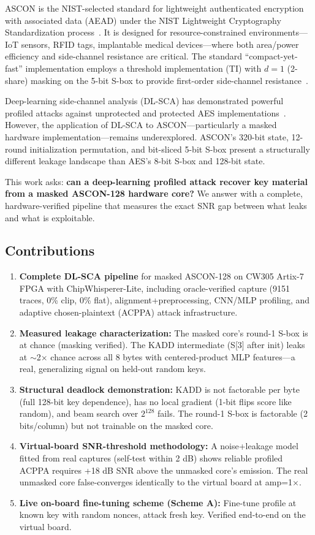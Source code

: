 \documentclass[a4paper,11pt,twocolumn]{article}
\begin{document}
ASCON is the NIST-selected standard for lightweight authenticated encryption with associated data (AEAD) under the NIST Lightweight Cryptography Standardization process~\cite{ascon_nist}. It is designed for resource-constrained environments---IoT sensors, RFID tags, implantable medical devices---where both area/power efficiency and side-channel resistance are critical. The standard ``compact-yet-fast'' implementation employs a threshold implementation (TI) with $d=1$ (2-share) masking on the 5-bit S-box to provide first-order side-channel resistance~\cite{compact_ascon}.

Deep-learning side-channel analysis (DL-SCA) has demonstrated powerful profiled attacks against unprotected and protected AES implementations~\cite{dlsca_survey}. However, the application of DL-SCA to ASCON---particularly a masked hardware implementation---remains underexplored. ASCON's 320-bit state, 12-round initialization permutation, and bit-sliced 5-bit S-box present a structurally different leakage landscape than AES's 8-bit S-box and 128-bit state.

This work asks: \textbf{can a deep-learning profiled attack recover key material from a masked ASCON-128 hardware core?} We answer with a complete, hardware-verified pipeline that measures the exact SNR gap between what leaks and what is exploitable.

\subsection{Contributions}

\begin{enumerate}[leftmargin=*,nosep]
\item \textbf{Complete DL-SCA pipeline} for masked ASCON-128 on CW305 Artix-7 FPGA with ChipWhisperer-Lite, including oracle-verified capture (9151 traces, 0\% clip, 0\% flat), alignment+preprocessing, CNN/MLP profiling, and adaptive chosen-plaintext (ACPPA) attack infrastructure.
\item \textbf{Measured leakage characterization:} The masked core's round-1 S-box is at chance (masking verified). The KADD intermediate (S[3] after init) leaks at $\sim$2$\times$ chance across all 8 bytes with centered-product MLP features---a real, generalizing signal on held-out random keys.
\item \textbf{Structural deadlock demonstration:} KADD is not factorable per byte (full 128-bit key dependence), has no local gradient (1-bit flips score like random), and beam search over $2^{128}$ fails. The round-1 S-box is factorable (2 bits/column) but not trainable on the masked core.
\item \textbf{Virtual-board SNR-threshold methodology:} A noise+leakage model fitted from real captures (self-test within 2 dB) shows reliable profiled ACPPA requires +18 dB SNR above the unmasked core's emission. The real unmasked core false-converges identically to the virtual board at amp=1$\times$.
\item \textbf{Live on-board fine-tuning scheme (Scheme A):} Fine-tune profile at known key with random nonces, attack fresh key. Verified end-to-end on the virtual board.
\end{enumerate}
\end{document}
